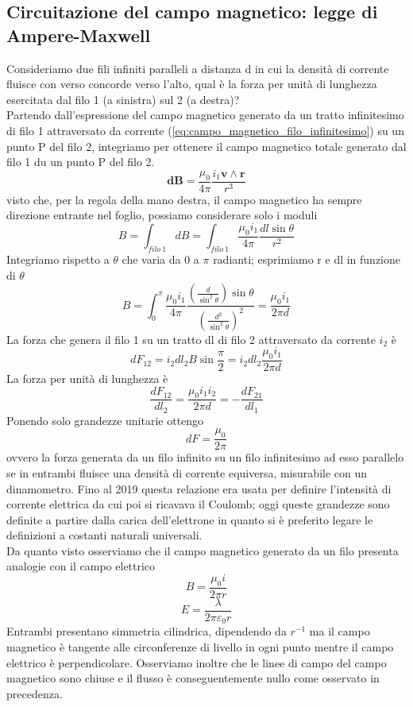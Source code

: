 \documentclass[10pt,a4paper]{article}
\begin{document}
\subsection{Circuitazione del campo magnetico: legge di Ampere-Maxwell}
Consideriamo due fili infiniti paralleli a distanza d in cui la densità di corrente fluisce con verso concorde verso l'alto, qual è la forza per unità di lunghezza esercitata dal filo 1 (a sinistra) sul 2 (a destra)? \\
Partendo dall'espressione del campo magnetico generato da un tratto infinitesimo di filo 1 attraversato da corrente (\ref{eq:campo_magnetico_filo_infinitesimo}) su un punto P del filo 2, integriamo per ottenere il campo magnetico totale generato dal filo 1 du un punto P del filo 2. 
\[\mathbf{dB} = \frac{\mu_0}{4\pi}\frac{i_1\mathbf{v}\wedge\mathbf{r}}{r^3} \]
visto che, per la regola della mano destra, il campo magnetico ha sempre direzione entrante nel foglio, possiamo considerare solo i moduli
\[B=\int_{filo\ 1}dB= \int_{filo\ 1}\frac{\mu_0 i_1 }{4\pi}\frac{dl \sin\theta}{r^2}\]
Integriamo rispetto a $\theta$ che varia da 0 a $\pi$ radianti; esprimiamo r e dl in funzione di $\theta$
\[B = \int_{0}^{\pi}\frac{\mu_0 i_1 }{4\pi}\frac{\left(\frac{d}{\sin^2\theta}\right) \sin\theta}{\left(\frac{d^2}{\sin^2\theta}\right)^2}= \frac{\mu_0 i_1}{2\pi d}\]
La forza che genera il filo 1 su un tratto dl di filo 2 attraversato da corrente \(i_2\) è 
\[dF_{12} = i_2dl_2 B\sin\frac{\pi}{2}=i_2dl_2 \frac{\mu_0 i_1}{2\pi d}\]
La forza per unità di lunghezza è 
\[\frac{dF_{12}}{dl_2}= \frac{\mu_0 i_1i_2}{2\pi d}=-\frac{dF_{21}}{dl_1}\]
Ponendo solo grandezze unitarie ottengo
\[dF = \frac{\mu_0}{2\pi}\]
ovvero la forza generata da un filo infinito su un filo infinitesimo ad esso parallelo se in entrambi fluisce una densità di corrente equiversa, misurabile con un dinamometro. Fino al 2019 questa relazione era usata per definire l'intensità di corrente elettrica da cui poi si ricavava il Coulomb; oggi queste grandezze sono definite a partire dalla carica dell'elettrone in quanto si è preferito legare le definizioni a costanti naturali universali.\\
Da quanto visto osserviamo che il campo magnetico generato da un filo presenta analogie con il campo elettrico
\[B = \frac{\mu_0 i}{2\pi r}\]
\[E = \frac{\lambda}{2\pi \varepsilon_0 r}\]
Entrambi presentano simmetria cilindrica, dipendendo da \(r^{-1}\) ma il campo magnetico è tangente alle circonferenze di livello in ogni punto mentre il campo elettrico è perpendicolare. Osserviamo inoltre che le linee di campo del campo magnetico sono chiuse e il flusso è conseguentemente nullo come osservato in precedenza. 
\end{document}
